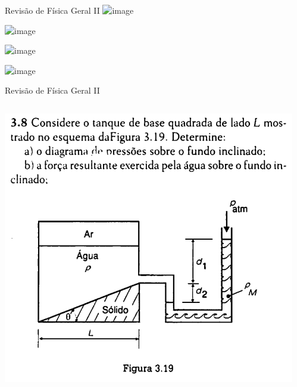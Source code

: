 \documentclass[t,%
brazilian,%
11pt,%
aspectratio=169,%
table%
]{beamer}
\begin{document}
 \begin{frame}{Revisão de Física Geral II}
     \centering 
     \includegraphics<+>[height=\textheight-28pt]{images/Captura de tela de 2025-04-01 15-36-19.png}

     \includegraphics<+>[height=\textheight-28pt]{images/Captura de tela de 2025-04-01 16-47-54.png}

     \includegraphics<+>[height=\textheight-28pt]{images/Captura de tela de 2025-04-01 15-37-11.png}

     \includegraphics<+>[height=\textheight-28pt]{images/Captura de tela de 2025-04-01 15-37-52.png}

 \end{frame}

 \begin{frame}{Revisão de Física Geral II}
     \begin{columns}[T]
         \begin{column}{0.45\textwidth}
             \includegraphics[width=\textwidth]{images/Captura de tela de 2025-04-01 15-55-30.png}
         \end{column}
         \begin{column}{0.45\textwidth}


\end{column}
\end{columns}
\end{frame}
\end{document}
